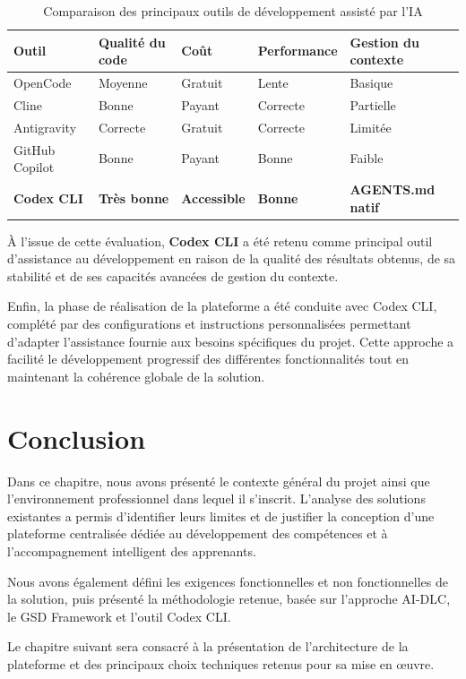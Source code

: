 \begin{table}[H]
\centering
\renewcommand{\arraystretch}{1.4}
\caption{Comparaison des principaux outils de développement assisté par l'IA}
\label{tab:benchmark-outils-ch1}
\begin{tabular}{|p{3cm}|p{2.5cm}|p{2.5cm}|p{2.7cm}|p{3cm}|}
\hline
\textbf{Outil} & \textbf{Qualité du code} & \textbf{Coût} & \textbf{Performance} & \textbf{Gestion du contexte} \\
\hline
OpenCode        & Moyenne   & Gratuit   & Lente        & Basique \\
\hline
Cline           & Bonne     & Payant    & Correcte     & Partielle \\
\hline
Antigravity     & Correcte  & Gratuit   & Correcte     & Limitée \\
\hline
GitHub Copilot  & Bonne     & Payant    & Bonne        & Faible \\
\hline
\textbf{Codex CLI} & \textbf{Très bonne} & \textbf{Accessible} & \textbf{Bonne} & \textbf{AGENTS.md natif} \\
\hline
\end{tabular}
\end{table}

À l'issue de cette évaluation, \textbf{Codex CLI} a été retenu comme principal outil d'assistance au développement en raison de la qualité des résultats obtenus, de sa stabilité et de ses capacités avancées de gestion du contexte.

Enfin, la phase de réalisation de la plateforme a été conduite avec Codex CLI, complété par des configurations et instructions personnalisées permettant d'adapter l'assistance fournie aux besoins spécifiques du projet. Cette approche a facilité le développement progressif des différentes fonctionnalités tout en maintenant la cohérence globale de la solution.



\section{Conclusion}

Dans ce chapitre, nous avons présenté le contexte général du projet ainsi que l'environnement professionnel dans lequel il s'inscrit. L'analyse des solutions existantes a permis d'identifier leurs limites et de justifier la conception d'une plateforme centralisée dédiée au développement des compétences et à l'accompagnement intelligent des apprenants.

Nous avons également défini les exigences fonctionnelles et non fonctionnelles de la solution, puis présenté la méthodologie retenue, basée sur l'approche AI-DLC, le GSD Framework et l'outil Codex CLI.

Le chapitre suivant sera consacré à la présentation de l'architecture de la plateforme et des principaux choix techniques retenus pour sa mise en œuvre.
